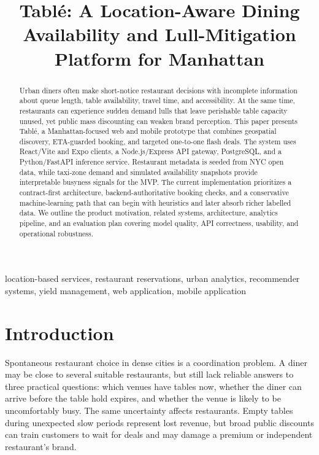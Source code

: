 \documentclass[conference]{IEEEtran}
\title{Tabl\'e: A Location-Aware Dining Availability and Lull-Mitigation Platform for Manhattan}
\author{
\IEEEauthorblockN{Yuhao Xu, Chukwuemeka Nwoke, Andrew Mitchell, Milo Dennehy, Yang Liu, Rui Xu}
\IEEEauthorblockA{School of Computer Science, University College Dublin\\
COMP47360 Research Practicum, Team 2\\
Application URL: \textbf{TODO: add deployed application URL}}
}
\begin{document}
\maketitle

\begin{abstract}
Urban diners often make short-notice restaurant decisions with incomplete information about queue length, table availability, travel time, and accessibility. At the same time, restaurants can experience sudden demand lulls that leave perishable table capacity unused, yet public mass discounting can weaken brand perception. This paper presents Tabl\'e, a Manhattan-focused web and mobile prototype that combines geospatial discovery, ETA-guarded booking, and targeted one-to-one flash deals. The system uses React/Vite and Expo clients, a Node.js/Express API gateway, PostgreSQL, and a Python/FastAPI inference service. Restaurant metadata is seeded from NYC open data, while taxi-zone demand and simulated availability snapshots provide interpretable busyness signals for the MVP. The current implementation prioritizes a contract-first architecture, backend-authoritative booking checks, and a conservative machine-learning path that can begin with heuristics and later absorb richer labelled data. We outline the product motivation, related systems, architecture, analytics pipeline, and an evaluation plan covering model quality, API correctness, usability, and operational robustness.
\end{abstract}

\begin{IEEEkeywords}
location-based services, restaurant reservations, urban analytics, recommender systems, yield management, web application, mobile application
\end{IEEEkeywords}

\section{Introduction}
Spontaneous restaurant choice in dense cities is a coordination problem. A diner may be close to several suitable restaurants, but still lack reliable answers to three practical questions: which venues have tables now, whether the diner can arrive before the table hold expires, and whether the venue is likely to be uncomfortably busy. The same uncertainty affects restaurants. Empty tables during unexpected slow periods represent lost revenue, but broad public discounts can train customers to wait for deals and may damage a premium or independent restaurant's brand.
\end{document}
